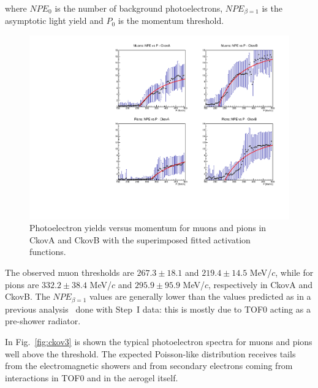 where $NPE_0$ is the number of background photoelectrons, $NPE_{\beta=1}$ is the asymptotic light yield and $P_0$ is the momentum threshold.

\begin{figure}[htb!]
  \begin{center}
    \includegraphics[width=0.85\columnwidth]{./03-Ckov/Figures/Ckov_photoelectrons_vs_P.pdf}
    \caption{Photoelectron yields versus momentum for muons and pions in CkovA and CkovB with the superimposed fitted activation functions.}
    \label{fig:ckov2}
  \end{center}
\end{figure}

The observed muon thresholds are $267.3\pm18.1$ and $219.4\pm14.5$ MeV/$c$, while for pions are $332.2\pm38.4$ MeV/$c$ and $295.9\pm95.9$ MeV/$c$, respectively in CkovA and CkovB. The $NPE_{\beta=1}$ values are generally lower than the values predicted as in a previous analysis~\cite{NOTE473} done with Step~I data: this is mostly due to TOF0 acting as a pre-shower radiator.

In Fig.~\ref{fig:ckov3} is shown the typical photoelectron spectra for muons and pions well above the threshold. The expected Poisson-like distribution receives tails from the electromagnetic showers and from secondary electrons coming from interactions in TOF0 and in the aerogel itself.

